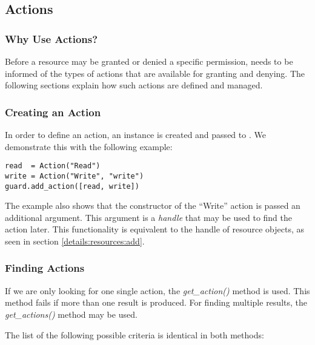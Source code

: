 \subsection{Actions}
\subsubsection{Why Use Actions?}

Before a resource may be granted or denied a specific permission, \product 
needs to be informed of the types of actions that are available for granting 
and denying. The following sections explain how such actions are defined 
and managed.

\subsubsection{Creating an Action}

In order to define an action, an instance is created and passed to \product. 
We demonstrate this with the following example:

\begin{lstlisting}
read  = Action("Read")
write = Action("Write", "write")
guard.add_action([read, write])
\end{lstlisting}

The example also shows that the constructor of the ``Write'' action is 
passed an additional argument. This argument is a {\it handle} that may be 
used to find the action later. This functionality is equivalent to the 
handle of resource objects, as seen in section \ref{details:resources:add}.


\subsubsection{\label{details:actions:find}Finding Actions}

If we are only looking for one single action, the {\it get\_action()} method 
is used. This method fails if more than one result is produced. For finding 
multiple results, the {\it get\_actions()} method may be used.

The list of the following possible criteria is identical in both methods:

